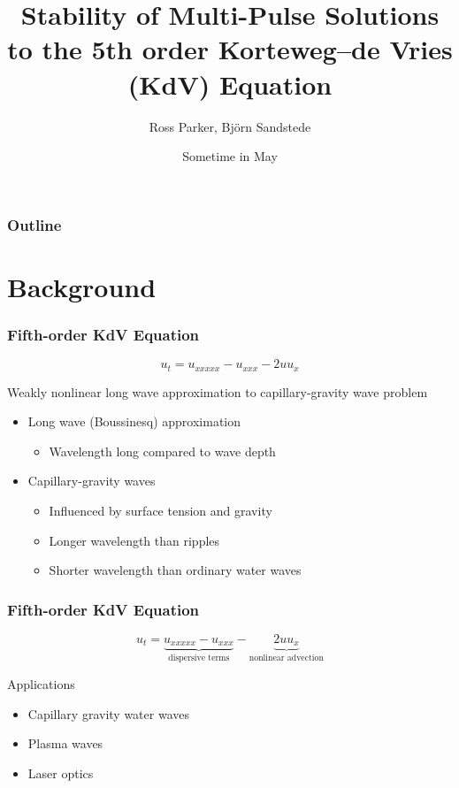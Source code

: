 \documentclass[16pt]{beamer}
\title[Stability of Multi-Pulses]{Stability of Multi-Pulse Solutions to the 5th order Korteweg–de Vries (KdV) Equation}
\author[R. Parker]{Ross Parker, Bj\"{o}rn Sandstede}
\institute{Brown University}
\date{Sometime in May}
\begin{document}
 
\frame{\titlepage}
 
\begin{frame}
\frametitle{Outline}
\tableofcontents
\end{frame}

\section{Background}

\begin{frame}
	\frametitle{Fifth-order KdV Equation }   
	\fontsize{16}{7.2}\selectfont
	\begin{center}
		\[ u_t = u_{xxxxx} - u_{xxx} - 2 u u_x \]
	\end{center}
	\vspace{0.5cm}
	Weakly nonlinear long wave approximation to capillary-gravity wave problem
	\vspace{0.5cm}
	\begin{itemize}
		\item Long wave (Boussinesq) approximation
		\begin{itemize} 
			\item Wavelength long compared to wave depth
		\end{itemize}
		\item Capillary-gravity waves
		\begin{itemize}
		    \item Influenced by surface tension and gravity
		    \item Longer wavelength than ripples
		    \item Shorter wavelength than ordinary water waves 
		\end{itemize}
	\end{itemize}
\end{frame}

\begin{frame}
	\frametitle{Fifth-order KdV Equation}
	\fontsize{16}{7.2}\selectfont
	\begin{description}
		\item
			\begin{center}
			\[ u_t = \underbrace{u_{xxxxx} - u_{xxx}}_{\text{dispersive terms}} - \underbrace{ 2 u u_x}_{\text{nonlinear advection}} \]
			\end{center}
		\vspace{0.5cm}

		Applications
		\begin{itemize}
			\item Capillary gravity water waves
			\item Plasma waves
			\item Laser optics
		\end{itemize}
	\end{description}
\end{frame}
\end{document}
